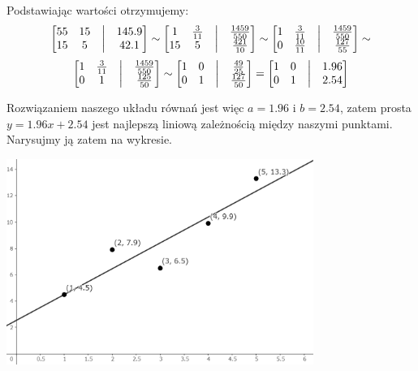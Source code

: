 \documentclass[a4paper,12pt]{article}
\begin{document}
Podstawiając wartości otrzymujemy:
\[
	\begin{bmatrix}
		55 & 15 & \bigm| & 145.9 \\
		15 & 5 & \bigm| & 42.1
	\end{bmatrix}
	\sim
	\begin{bmatrix}
		1 & \frac{3}{11} & \bigm| & \frac{1459}{550} \\
		15 & 5 & \bigm| & \frac{421}{10} \\
	\end{bmatrix}
	\sim
	\begin{bmatrix}
		1 & \frac{3}{11} & \bigm| & \frac{1459}{550} \\
		0 & \frac{10}{11} & \bigm| & \frac{127}{55}  \\
	\end{bmatrix}
	\sim
\]
\[
	\begin{bmatrix}
		1 & \frac{3}{11} & \bigm| & \frac{1459}{550} \\
		0 & 1 & \bigm| & \frac{125}{50} \\
	\end{bmatrix}
	\sim
	\begin{bmatrix}
		1 & 0 & \bigm| & \frac{49}{25} \\
		0 & 1 & \bigm| & \frac{127}{50} \\
	\end{bmatrix}
	=
	\begin{bmatrix}
		1 & 0 & \bigm| & 1.96 \\
		0 & 1 & \bigm| & 2.54 \\
	\end{bmatrix}
\]

Rozwiązaniem naszego układu równań jest więc \(a = 1.96\) i \(b = 2.54\), zatem prosta \(y = 1.96x + 2.54\) jest najlepszą liniową zależnością między naszymi punktami. Narysujmy ją zatem na wykresie.

\begin{center}
	\includegraphics[width=0.75\textwidth]{Figures/figure-4.png}
\end{center}
\end{document}
